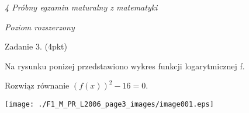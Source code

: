 \documentclass[a4paper,12pt]{article}
\begin{document}
{\it 4 Próbny egzamin maturalny z matematyki}

{\it Poziom rozszerzony}

Zadanie 3. (4pkt)

Na rysunku ponizej przedstawiono wykres funkcji logarytmicznej f.

Rozwiąz równanie $(f(x))^{2}-16=0.$
\begin{center}
\texttt{[image: ./F1\_M\_PR\_L2006\_page3\_images/image001.eps]}
\end{center}
\end{document}
